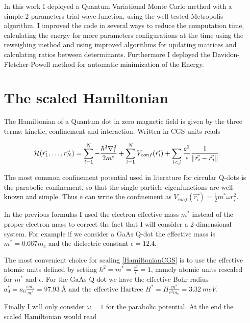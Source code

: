 In this work I deployed a Quantum Variational Monte Carlo method with a simple 2 parameters trial wave function, using the well-tested Metropolis algorithm.
I improved the code in several ways to reduce the computation time, calculating the energy for more parameters configurations at the time using the reweighing method and using improved algorithms for updating matrices and calculating ratios between determinants.
Furthermore I deployed the Davidon-Fletcher-Powell method for automatic minimization of the Energy.

\section{The scaled Hamiltonian}

The Hamiltonian of a Quantum dot in zero magnetic field is given by the three terms: kinetic, confinement and interaction.
Written in CGS units reads

\begin{equation}
  \mathcal{H}(\vec{r_1},\dots,\vec{r_N}) = \sum_{i=1}^N -\dfrac{\hbar^2\nabla_i^2}{2m^*} + \sum_{i=1}^N V_{conf}(\vec{r_i}) + \sum_{i<j}\dfrac{e^2}{\epsilon}\dfrac{1}{{\| \vec{r_i}-\vec{r_j} \|}}.
  \label{HamiltonianCGS}
\end{equation}

The most common confinement potential used in literature for circular Q-dots is the parabolic confinement, so that the single particle eigenfunctions are well-known and simple.
Thus e can write the confinement as $V_{conf}(\vec{r_i})=\frac{1}{2}m^*\omega r_i^2$.

In the previous formulas I used the electron effective mass $m^*$ instead of the proper electron mass to correct the fact that I will consider a 2-dimensional system.
For example if we consider a GaAs Q-dot the effective mass is $m^*=0.067m_e$ and the dielectric constant $\epsilon=12.4$\cite{Pederiva2000}.

The most convenient choice for scaling \autoref{HamiltonianCGS} is to use the effective atomic units defined by setting $\hbar^2=m^*=\frac{e^2}{\epsilon}=1$, namely atomic units rescaled for $m^*$ and $\epsilon$.
For the GaAs Q-dot we have the effective Bohr radius $a^*_0=a_0\frac{\epsilon m_e}{m^*}=\SI{97.93}{\angstrom}$ and the effective Hartree $H^*=H\frac{m^*}{\epsilon^2m_e}=\SI{3.32}{meV}$.

Finally I will only consider $\omega=1$ for the parabolic potential.
At the end the scaled Hamiltonian would read

